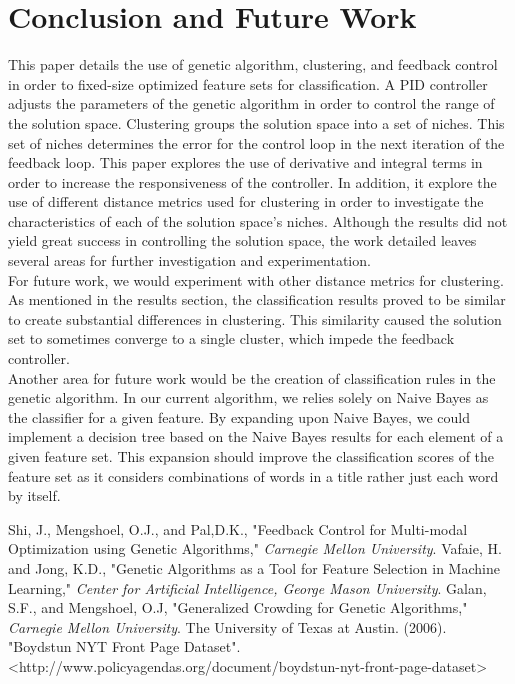 \documentclass{sig-alternate}
\begin{document}
\section{Conclusion and Future Work}
This paper details the use of genetic algorithm, clustering, and feedback control in order to fixed-size optimized feature sets for classification. A PID controller adjusts the parameters of the genetic algorithm in order to control the range of the solution space. Clustering groups the solution space into a set of niches. This set of niches determines the error for the control loop in the next iteration of the feedback loop. This paper explores the use of derivative and integral terms in order to increase the responsiveness of the controller. In addition, it explore the use of different distance metrics used for clustering in order to investigate the characteristics of each of the solution space's niches. Although the results did not yield great success in controlling the solution space, the work detailed leaves several areas for further investigation and experimentation.\\
\indent For future work, we would experiment with other distance metrics for clustering. As mentioned in the results section, the classification results proved to be similar to create substantial differences in clustering. This similarity caused the solution set to sometimes converge to a single cluster, which impede the feedback controller.\\
\indent Another area for future work would be the creation of classification rules in the genetic algorithm. In our current algorithm, we relies solely on Naive Bayes as the classifier for a given feature. By expanding upon Naive Bayes, we could implement a decision tree based on the Naive Bayes results for each element of a given feature set. This expansion should improve the classification scores of the feature set as it considers combinations of words in a title rather just each word by itself.

\begin{thebibliography}{100}
	
	 Shi, J., Mengshoel, O.J., and Pal,D.K., "Feedback Control for Multi-modal Optimization using Genetic Algorithms," \emph{Carnegie Mellon University}.
	 Vafaie, H. and Jong, K.D., "Genetic Algorithms as a Tool for Feature Selection in Machine Learning," \emph{Center for Artificial Intelligence, George Mason University}.
	 Galan, S.F., and Mengshoel, O.J, "Generalized Crowding for Genetic Algorithms," \emph{Carnegie Mellon University}.
	The University of Texas at Austin. (2006). "Boydstun NYT Front Page Dataset". <http://www.policyagendas.org/document/boydstun-nyt-front-page-dataset>
	
\end{thebibliography}
\end{document}
